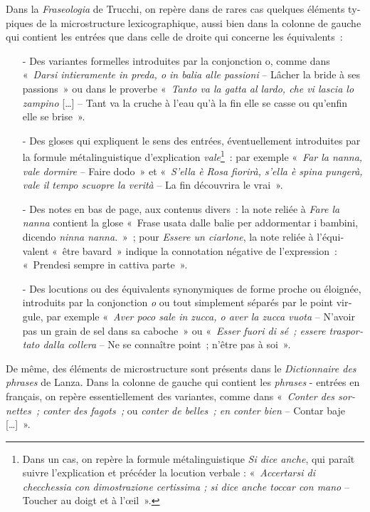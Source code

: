 \documentclass[output=paper,booklanguage=french]{langscibook}
\begin{document}
\begin{otherlanguage}{french}
Dans la \emph{Fraseologia} de Trucchi, on repère dans de rares cas quelques éléments typiques de la microstructure lexicographique, aussi bien dans la colonne de gauche qui contient les entrées que dans celle de droite qui concerne les équivalents~: 
\begin{itemize}
    \item [-] Des variantes formelles introduites par la conjonction o, comme dans «~\emph{Darsi intieramente in preda, o in balia alle passioni} – Lâcher la bride à ses passions~» ou dans le proverbe «~\emph{Tanto va la gatta al lardo, che vi lascia lo zampino} […] – Tant va la cruche à l’eau qu’à la fin elle se casse ou qu’enfin elle se brise~».
    \item [-] Des gloses qui expliquent le sens des entrées, éventuellement introduites par la formule métalinguistique d’explication \emph{vale}\footnote{Dans un cas, on repère la formule métalinguistique \emph{Si dice anche}, qui paraît suivre l’explication et précéder la locution verbale : «~\emph{Accertarsi di checchessia con dimostrazione certissima ; si dice anche toccar con mano} – Toucher au doigt et à l’œil~».}~: par exemple «~\emph{Far la nanna, vale dormire} – Faire dodo~» et «~\emph{S’ella è Rosa fiorirà, s’ella è spina pungerà, vale il tempo scuopre la verità} – La fin découvrira le vrai~».
    \item [-] Des notes en bas de page, aux contenus divers~: la note reliée à \emph{Fare la nanna} contient la glose «~Frase usata dalle balie per addormentar i bambini, dicendo \emph{ninna nanna}.~»~; pour \emph{Essere un ciarlone}, la note reliée à l’équivalent «~être bavard~» indique la connotation négative de l’expression~: «~Prendesi sempre in cattiva parte~».
    \item [-] Des locutions ou des équivalents synonymiques de forme proche ou éloignée, introduits par la conjonction \emph{o} ou tout simplement séparés par le point virgule, par exemple «~\emph{Aver poco sale in zucca, o aver la zucca vuota} – N’avoir pas un grain de sel dans sa caboche~» ou «~\emph{Esser fuori di sé~; essere trasportato dalla collera} – Ne se connaître point~; n’être pas à soi~».
\end{itemize}

De même, des éléments de microstructure sont présents dans le \emph{Dictionnaire des phrases} de Lanza. Dans la colonne de gauche qui contient les \emph{phrases} - entrées en français, on repère essentiellement des variantes, comme dans «~\emph{Conter des sornettes~; conter des fagots~;} ou \emph{conter de belles~; en conter bien} – Contar baje […]~». 


\end{otherlanguage}
\end{document}
